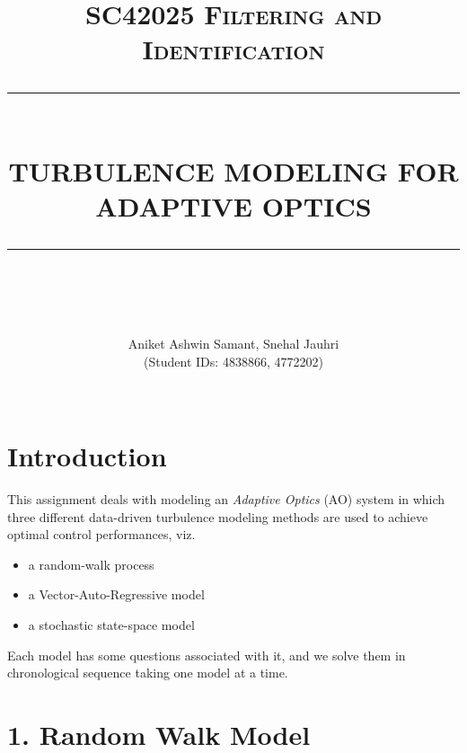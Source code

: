\documentclass[12pt]{report}
\newcommand{\HRule}[1]{\rule{\linewidth}{#1}}
\begin{document}
\title{ \normalsize \textsc{SC42025 Filtering and Identification}
		\\ [2.0cm]
		\HRule{0.5pt} \\
		\LARGE \textbf{\uppercase{Turbulence Modeling for Adaptive Optics}}
		\HRule{2pt} \\ [0.5cm]
		\normalsize %
		\vspace*{5\baselineskip}}


\author{
		Aniket Ashwin Samant, Snehal Jauhri \\
		(Student IDs: 4838866, 4772202) \\ 
 \\ }

\maketitle
\tableofcontents
\newpage

\sectionfont{\scshape}


\section*{Introduction}

This assignment deals with modeling an \textit{Adaptive Optics} (AO) system in which three different data-driven turbulence modeling methods are used to achieve optimal control performances, viz.
\begin{itemize}
	\item a random-walk process
	\item a Vector-Auto-Regressive model
	\item a stochastic state-space model
\end{itemize}

Each model has some questions associated with it, and we solve them in chronological sequence taking one model at a time.

\section*{1. Random Walk Model}
\end{document}
